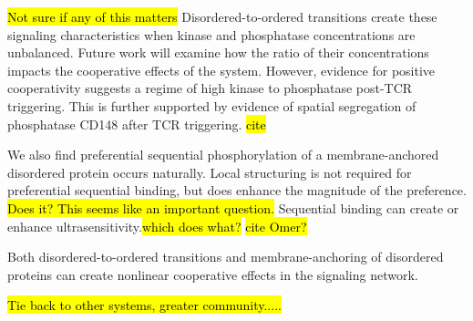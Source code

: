 \documentclass[../../AdvancementSummary.tex]{subfiles}
\begin{document}
\hl{Not sure if any of this matters}
Disordered-to-ordered transitions create these signaling characteristics when kinase and phosphatase concentrations are unbalanced. Future work will examine how the ratio of their concentrations impacts the cooperative effects of the system. However, evidence for positive cooperativity suggests a regime of high kinase to phosphatase post-TCR triggering. This is further supported by evidence of spatial segregation of phosphatase CD148 after TCR triggering. \hl{cite} 

We also find preferential sequential phosphorylation of a membrane-anchored disordered protein occurs naturally. Local structuring is not required for preferential sequential binding, but does enhance the magnitude of the preference. \hl{Does it?  This seems like an important question.} Sequential binding can create or enhance ultrasensitivity.\hl{which does what?} \hl{cite Omer?}

Both disordered-to-ordered transitions and membrane-anchoring of disordered proteins can create nonlinear cooperative effects in the signaling network. 

\hl{Tie back to other systems, greater community.....} 


\end{document}
